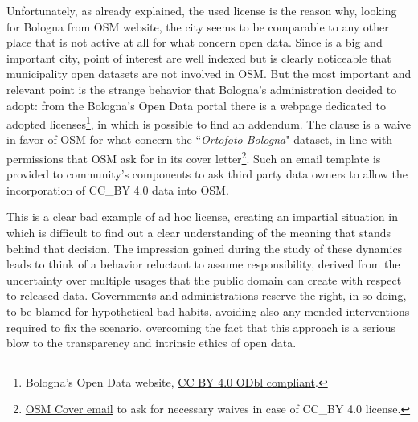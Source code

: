 Unfortunately, as already explained, the used license is the reason why, looking for Bologna from OSM website, the city seems to be comparable to any other place that is not active at all for what concern open data. Since is a big and important city, point of interest are well indexed but is clearly noticeable that municipality open datasets are not involved in OSM.
But the most important and relevant point is the strange behavior that Bologna's administration decided to adopt: from the Bologna's Open Data portal there is a webpage dedicated to adopted licenses\footnote{Bologna's Open Data website, \href{http://dati.comune.bologna.it/node/3449}{CC BY 4.0 ODbl compliant}.}, in which is possible to find an addendum.
The clause is a waive in favor of OSM for what concern the ``\textit{Ortofoto Bologna}" dataset, in line with permissions that OSM ask for in its cover letter\footnote{\href{https://wiki.openstreetmap.org/wiki/CM/en/001_-_Cover_letter_and_waiver_template_for_CC_BY_v4}{OSM Cover email} to ask for necessary waives in case of CC\_BY 4.0 license.}.
Such an email template is provided to community's components to ask third party data owners to allow the incorporation of CC\_BY 4.0 data into OSM.

This is a clear bad example of ad hoc license, creating an impartial situation in which is difficult to find out a clear understanding of the meaning that stands behind that decision.
The impression gained during the study of these dynamics leads to think of a behavior reluctant to assume responsibility, derived from the uncertainty over multiple usages that the public domain can create with respect to released data.
Governments and administrations reserve the right, in so doing, to be blamed for hypothetical bad habits, avoiding also any mended interventions required to fix the scenario, overcoming the fact that this approach is a serious blow to the transparency and intrinsic ethics of open data.
